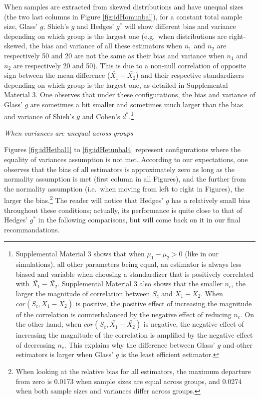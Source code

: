 \documentclass[
  english,
  man,floatsintext]{apa6}
\begin{document}
When samples are extracted from skewed distributions and have unequal sizes (the two last columns in Figure \ref{fig:idHomunbal}), for a constant total sample size, Glass' \(g\), Shieh's \(g\) and Hedges' \(g^*\) will show different bias and variance depending on which group is the largest one (e.g.~when distributions are right-skewed, the bias and variance of all these estimators when \(n_1\) and \(n_2\) are respectively 50 and 20 are not the same as their bias and variance when \(n_1\) and \(n_2\) are respectively 20 and 50). This is due to a non-null correlation of opposite sign between the mean difference (\(\bar{X_1}-\bar{X_2}\)) and their respective standardizers depending on which group is the largest one, as detailed in Supplemental Material 3. One observes that under these configurations, the bias and variance of Glass' \(g\) are sometimes a bit smaller and sometimes much larger than the bias and variance of Shieh's \(g\) and Cohen's \(d^*\).\footnote{Supplemental Material 3 shows that when $\mu_1-\mu_2 >0$ (like in our simulations), all other parameters being equal, an estimator is always less biased and variable when choosing a standardizer that is positively correlated with $\bar{X_1}-\bar{X_2}$. Supplemental Material 3 also shows that the smaller $n_c$, the larger the magnitude of correlation between $S_c$ and $\bar{X_1}-\bar{X_2}$. When $cor(S_c,\bar{X_1}-\bar{X_2})$ is positive, the positive effect of increasing the magnitude of the correlation is counterbalanced by the negative effect of reducing $n_c$. On the other hand, when $cor(S_c,\bar{X_1}-\bar{X_2})$ is negative, the negative effect of increasing the magnitude of the correlation is amplified by the negative effect of decreasing $n_c$. This explains why the difference between Glass' $g$ and other estimators is larger when Glass' $g$ is the least efficient estimator.}

\emph{When variances are unequal across groups}

Figures \ref{fig:idHetbal1} to \ref{fig:idHetunbal4} represent configurations where the equality of variances assumption is not met. According to our expectations, one observes that the bias of all estimators is approximately zero as long as the normality assumption is met (first column in all Figures), and the further from the normality assumption (i.e.~when moving from left to right in Figures), the larger the bias.\footnote{When looking at the relative bias for all estimators, the maximum departure from zero is 0.0173 when sample sizes are equal across groups, and 0.0274 when both sample sizes and variances differ across groups.} The reader will notice that Hedges' \(g\) has a relatively small bias throughout these conditions; actually, its performance is quite close to that of Hedges' \(g^*\) in the following comparisons, but will come back on it in our final recommandations.
\end{document}
